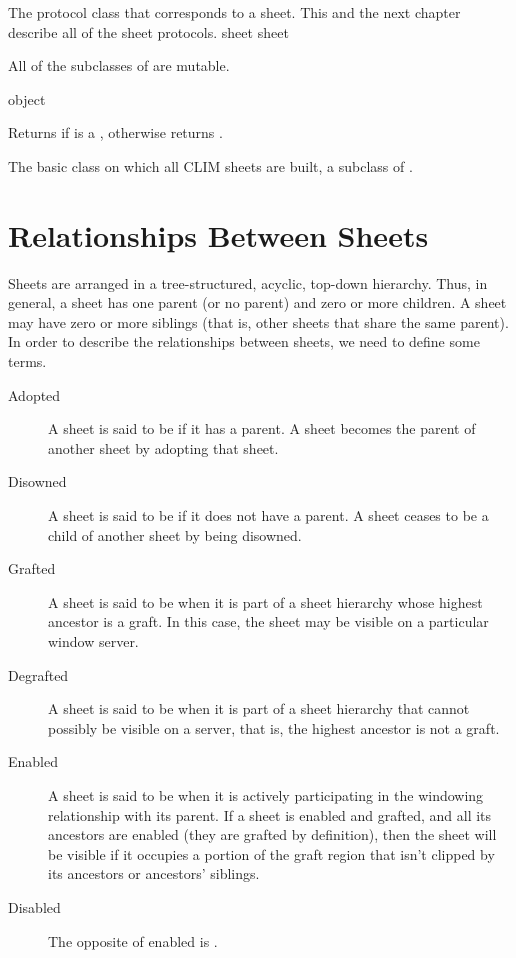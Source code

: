 
The protocol class that corresponds to a sheet.  This and the next chapter
describe all of the sheet protocols.
 {sheet} {sheet}

All of the subclasses of  are mutable.

 {object}

Returns  if  is a , otherwise returns
.


The basic class on which all CLIM sheets are built, a subclass of .
\AbstractClass



\section {Relationships Between Sheets}

Sheets are arranged in a tree-structured, acyclic, top-down hierarchy.  Thus, in
general, a sheet has one parent (or no parent) and zero or more children.  A
sheet may have zero or more siblings (that is, other sheets that share the same
parent).  In order to describe the relationships between sheets, we need to
define some terms.

\begin{description}
\item [Adopted] A sheet is said to be  if it has a parent.  A
sheet becomes the parent of another sheet by adopting that sheet.

\item [Disowned] A sheet is said to be  if it does not have a
parent.  A sheet ceases to be a child of another sheet by being disowned.

\item [Grafted] A sheet is said to be  when it is part of a
sheet hierarchy whose highest ancestor is a graft.  In this case, the sheet may
be visible on a particular window server.

\item [Degrafted] A sheet is said to be  when it is part of a
sheet hierarchy that cannot possibly be visible on a server, that is, the
highest ancestor is not a graft.

\item [Enabled] A sheet is said to be  when it is actively
participating in the windowing relationship with its parent.  If a sheet is
enabled and grafted, and all its ancestors are enabled (they are grafted by
definition), then the sheet will be visible if it occupies a portion of the
graft region that isn't clipped by its ancestors or ancestors' siblings.

\item [Disabled] The opposite of enabled is .
\end{description}


